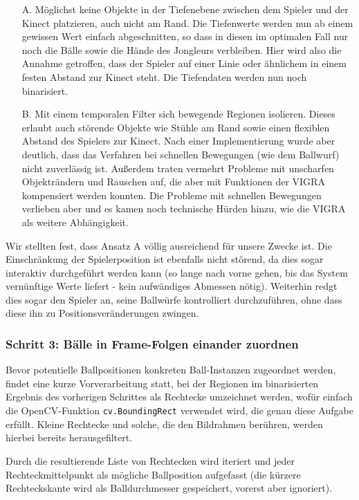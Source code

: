 \documentclass[12pt,a4paper,ngerman]{scrartcl}
\begin{document}
\begin{itemize}
\item[A.]Möglichst keine Objekte in der Tiefenebene zwischen dem Spieler und der Kinect platzieren, auch nicht am Rand. Die Tiefenwerte
werden nun ab einem gewissen Wert einfach abgeschnitten, so dass in diesen im optimalen Fall nur noch die Bälle sowie die Hände des
Jongleurs verbleiben. Hier wird also die Annahme getroffen, dass der Spieler auf einer Linie oder ähnlichem in einem festen Abstand zur
Kinect steht. Die Tiefendaten werden nun noch binarisiert.
\item[B.]Mit einem temporalen Filter sich bewegende Regionen isolieren. Dieses erlaubt auch störende Objekte wie Stühle am Rand sowie
einen flexiblen Abstand des Spielers zur Kinect. Nach einer Implementierung wurde aber deutlich, dass das Verfahren bei schnellen Bewegungen
(wie dem Ballwurf) nicht zuverlässig ist. Außerdem traten vermehrt Probleme mit unscharfen Objekträndern und Rauschen auf, die aber mit Funktionen der VIGRA\cite{vigra} kompensiert werden konnten. Die Probleme mit schnellen Bewegungen verlieben aber und es kamen noch technische Hürden hinzu, wie die VIGRA\cite{vigra} als weitere Abhängigkeit.
\end{itemize}

Wir stellten fest, dass Ansatz A völlig ausreichend für unsere Zwecke ist. Die Einschränkung der Spielerposition ist ebenfalls nicht störend, da dies sogar interaktiv durchgeführt werden kann (so lange nach vorne gehen, bis das System vernünftige Werte liefert - kein aufwändiges Abmessen nötig). Weiterhin redgt dies sogar den Spieler an, seine Ballwürfe kontrolliert durchzuführen, ohne dass diese ihn zu Positionsveränderungen zwingen.

\subsubsection{Schritt 3: Bälle in Frame-Folgen einander zuordnen}

Bevor potentielle Ballpositionen konkreten Ball-Instanzen zugeordnet werden, findet eine kurze Vorverarbeitung statt, bei der Regionen im binarisierten Ergebnis des vorherigen Schrittes als Rechtecke umzeichnet werden, wofür einfach die OpenCV-Funktion \lstinline{cv.BoundingRect} verwendet wird, die genau diese Aufgabe erfüllt.
Kleine Rechtecke und solche, die den Bildrahmen berühren, werden hierbei bereits herausgefiltert.

Durch die resultierende Liste von Rechtecken wird iteriert und jeder 
Rechteckmittelpunkt als mögliche Ballposition aufgefasst (die kürzere Rechteckskante
wird als Balldurchmesser gespeichert, vorerst aber ignoriert).
\end{document}
